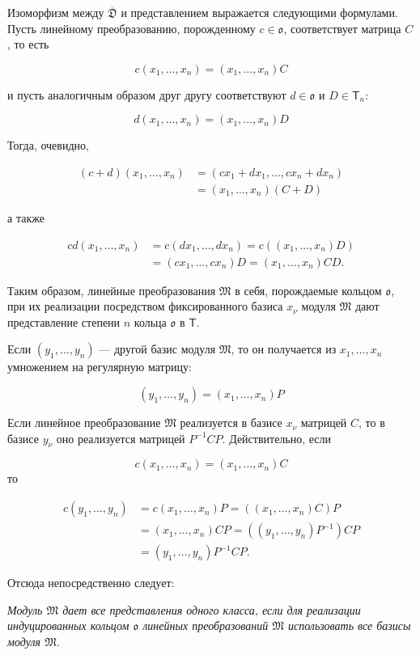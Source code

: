 \documentclass[11pt]{article}
\begin{document}
Изоморфизм между \(\overline{\mathfrak D}\) и представлением выражается следующими формулами. Пусть линейному преобразованию, порожденному \(c\in\mathfrak{o}\), соответствует матрица \(C\), то есть

\[
c(x_1,\ldots,x_n)=(x_1,\ldots,x_n)C
\]

и пусть аналогичным образом друг другу соответствуют \(d\in\mathfrak{o}\) и \(D\in\mathsf T_n\):

\[
d(x_1,\ldots,x_n)=(x_1,\ldots,x_n)D
\]

Тогда, очевидно,

\[
\begin{aligned}
(c+d)(x_1,\ldots,x_n)
&=(cx_1+dx_1,\ldots,cx_n+dx_n)\\
&=(x_1,\ldots,x_n)(C+D)
\end{aligned}
\]

а также

\[
\begin{aligned}
cd(x_1,\ldots,x_n)
&=c(dx_1,\ldots,dx_n)=c((x_1,\ldots,x_n)D)\\
&=(cx_1,\ldots,cx_n)D=(x_1,\ldots,x_n)CD.
\end{aligned}
\]

Таким образом, линейные преобразования \(\mathfrak M\) в себя, порождаемые кольцом \(\mathfrak{o}\), при их реализации посредством фиксированного базиса \(x_\nu\) модуля \(\mathfrak M\) дают представление степени \(n\) кольца \(\mathfrak{o}\) в \(\mathsf T\).

Если \((y_1,\ldots,y_n)\) --- другой базис модуля \(\mathfrak M\), то он получается из \(x_1,\ldots,x_n\) умножением на регулярную матрицу:

\[(y_1,\ldots,y_n)=(x_1,\ldots,x_n)P\]

Если линейное преобразование \(\mathfrak M\) реализуется в базисе \(x_\nu\) матрицей \(C\), то в базисе \(y_\nu\) оно реализуется матрицей \(P^{-1}CP\). Действительно, если

\[c(x_1,\ldots,x_n)=(x_1,\ldots,x_n)C\]
то

\[
\begin{aligned}
c(y_1,\ldots,y_n)
&=c(x_1,\ldots,x_n)P=((x_1,\ldots,x_n)C)P\\
&=(x_1,\ldots,x_n)CP=((y_1,\ldots,y_n)P^{-1})CP\\
&=(y_1,\ldots,y_n)P^{-1}CP.
\end{aligned}
\]

Отсюда непосредственно следует:

\emph{Модуль \(\mathfrak M\) дает все представления одного класса, если для реализации индуцированных кольцом \(\mathfrak{o}\) линейных преобразований \(\mathfrak M\) использовать все базисы модуля \(\mathfrak M\).}
\end{document}
